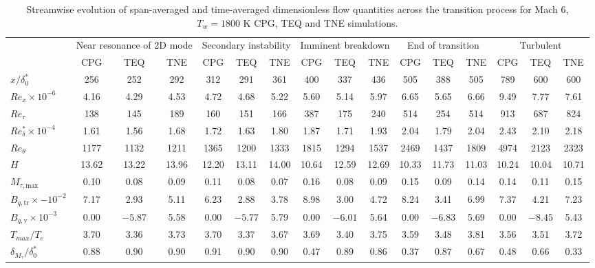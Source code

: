 \newpage
\begin{table}
\centering
\caption{Streamwise evolution of span-averaged and time-averaged dimensionless flow quantities across the transition process for Mach 6, $T_w = 1800$ K CPG, TEQ and TNE simulations.}
\begin{tabular}{lccc ccc ccc ccc ccc}
\toprule
 & \multicolumn{3}{c}{Near resonance of 2D mode} 
 & \multicolumn{3}{c}{Secondary instability} 
 & \multicolumn{3}{c}{Imminent breakdown} 
 & \multicolumn{3}{c}{End of transition} 
 & \multicolumn{3}{c}{Turbulent} \\
\cmidrule(lr){2-4} \cmidrule(lr){5-7} \cmidrule(lr){8-10} \cmidrule(lr){11-13} \cmidrule(lr){14-16}
 & CPG & TEQ & TNE & CPG & TEQ & TNE & CPG & TEQ & TNE & CPG & TEQ & TNE & CPG & TEQ & TNE \\
\midrule
$x/\delta^*_0$ & 256 & 252 & 292 & 312 & 291 & 361 & 400 & 337 & 436 & 505 & 388 & 505 & 789 & 600 & 600 \\
$Re_x \times 10^{-6}$ & 4.16 & 4.29 & 4.53 & 4.72 & 4.68 & 5.22 & 5.60 & 5.14 & 5.97 & 6.65 & 5.65 & 6.66 & 9.49 & 7.77 & 7.61 \\
$Re_\tau$ & 138 & 145 & 189 & 160 & 151 & 166 & 387 & 175 & 240 & 514 & 254 & 514 & 913 & 687 & 824 \\
$Re^*_\delta \times 10^{-4}$ & 1.61 & 1.56 & 1.68 & 1.72 & 1.63 & 1.80 & 1.87 & 1.71 & 1.93 & 2.04 & 1.79 & 2.04 & 2.43 & 2.10 & 2.18 \\
$Re_\theta$ & 1177 & 1132 & 1211 & 1365 & 1200 & 1333 & 1815 & 1294 & 1537 & 2469 & 1437 & 1809 & 4974 & 2123 & 2323 \\
$H$ & 13.62 & 13.22 & 13.96 & 12.20 & 13.11 & 14.00 & 10.64 & 12.59 & 12.69 & 10.33 & 11.73 & 11.03 & 10.24 & 10.04 & 10.71 \\
$M_{\tau,\mathrm{max}}$ & 0.10 & 0.08 & 0.09 & 0.11 & 0.08 & 0.07 & 0.16 & 0.08 & 0.09 & 0.15 & 0.09 & 0.14 & 0.14 & 0.11 & 0.15 \\
$B_{q,\mathrm{tr}} \times -10^{-2}$ & 7.17 & 2.93 & 5.11 & 6.23 & 2.88 & 3.78 & 8.98 & 3.00 & 4.72 & 8.24 & 3.41 & 6.99 & 7.37 & 4.21 & 7.23 \\
$B_{q,\mathrm{v}} \times 10^{-3}$ & 0.00 & $-5.87$ & 5.58 & 0.00 & $-5.77$ & 5.79 & 0.00 & $-6.01$ & 5.64 & 0.00 & $-6.83$ & 5.69 & 0.00 & $-8.45$ & 5.43 \\
$T_{max}/T_e$ & 3.70 & 3.36 & 3.73 & 3.70 & 3.37 & 3.67 & 3.69 & 3.40 & 3.75 & 3.59 & 3.48 & 3.81 & 3.56 & 3.51 & 3.72 \\
$\delta_{M_\tau}/\delta^{*}_{0}$ & 0.88 & 0.90 & 0.90 & 0.91 & 0.90 & 0.90 & 0.47 & 0.89 & 0.86 & 0.37 & 0.87 & 0.67 & 0.48 & 0.66 & 0.33 \\

\end{tabular}
\end{table}

